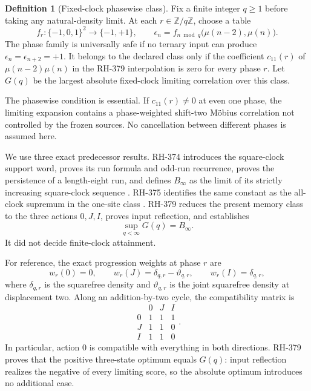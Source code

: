 \documentclass[11pt]{article}
\theoremstyle{definition}
\newtheorem{definition}[theorem]{Definition}
\theoremstyle{remark}
\newcommand{\mob}{\mu}
\newcommand{\Z}{\mathbb Z}
\newcommand{\dd}{\delta}
\newcommand{\thh}{\vartheta}
\begin{document}
\begin{definition}[Fixed-clock phasewise class]
Fix a finite integer $q\ge1$ before taking any natural-density limit.  At
each $r\in\Z/q\Z$, choose a table
\[
 f_r:\{-1,0,1\}^2\longrightarrow\{-1,+1\},
 \qquad
 \epsilon_n=f_{n\bmod q}\bigl(\mob(n-2),\mob(n)\bigr).
\]
The phase family is universally safe if no ternary input can produce
$\epsilon_n=\epsilon_{n+2}=+1$.  It belongs to the declared class only if
the coefficient $c_{11}(r)$ of
$\mob(n-2)\mob(n)$ in the RH-379 interpolation is zero for every phase
$r$.  Let $G(q)$ be the largest absolute fixed-clock limiting correlation
over this class.
\end{definition}

The phasewise condition is essential.  If $c_{11}(r)\ne0$ at even one
phase, the limiting expansion contains a phase-weighted shift-two M\"obius
correlation not controlled by the frozen sources.  No cancellation between
different phases is assumed here.

We use three exact predecessor results.  RH-374 introduces the square-clock
support word, proves its run formula and odd-run recurrence, proves the
persistence of a length-eight run, and defines $B_\infty$ as the limit of
its strictly increasing square-clock sequence \cite{RH374}.  RH-375
identifies the same constant as the all-clock supremum in the one-site
class \cite{RH375}.  RH-379 reduces the present memory class to the three
actions $0,J,I$, proves input reflection, and establishes
\begin{equation}
 \sup_{q<\infty}G(q)=B_\infty.
 \label{eq:rh379-supremum}
\end{equation}
It did not decide finite-clock attainment.

For reference, the exact progression weights at phase $r$ are
\[
 w_r(0)=0,\qquad w_r(J)=\dd_{q,r}-\thh_{q,r},\qquad
 w_r(I)=\dd_{q,r},
\]
where $\dd_{q,r}$ is the squarefree density and $\thh_{q,r}$ is the joint
squarefree density at displacement two.  Along an addition-by-two cycle,
the compatibility matrix is
\begin{equation}
\begin{array}{c|ccc}
 &0&J&I\\ \hline
0&1&1&1\\
J&1&1&0\\
I&1&1&0
\end{array}.
\label{eq:compatibility}
\end{equation}
In particular, action $0$ is compatible with everything in both directions.
RH-379 proves that the positive three-state optimum equals $G(q)$: input
reflection realizes the negative of every limiting score, so the absolute
optimum introduces no additional case.
\end{document}
